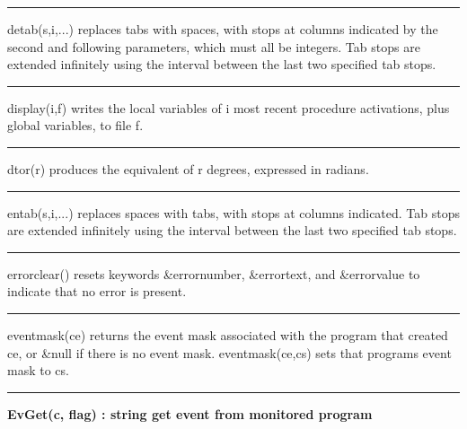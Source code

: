 \bigskip\hrule\vspace{0.1cm}

\noindent
detab(s,i,...) replaces tabs with spaces, with stops at columns
indicated by the second and following parameters, which must all be
integers. Tab stops are extended infinitely using the interval between
the last two specified tab stops.

\bigskip\hrule\vspace{0.1cm}

\noindent
{}display(i,f) writes the local variables of i most
recent procedure activations, plus global variables, to file f.

\bigskip\hrule\vspace{0.1cm}

\noindent
{}dtor(r) produces the
equivalent of r degrees, expressed in radians.

\bigskip\hrule\vspace{0.1cm}

\noindent
entab(s,i,...) replaces spaces with tabs, with stops at columns
indicated. Tab stops are extended infinitely using the interval between
the last two specified tab stops.

\bigskip\hrule\vspace{0.1cm}

\noindent
{}errorclear() resets keywords \&errornumber,
\&errortext, and \&errorvalue to indicate that no error is present.

\bigskip\hrule\vspace{0.1cm}

\noindent
{}eventmask(ce) returns the event mask associated
with the program that created ce, or \&null if there is no event mask.
eventmask(ce,cs) sets that program{\textquotesingle}s event mask to cs.

\bigskip\hrule\vspace{0.1cm}
\noindent
{\bf EvGet(c, flag) : string \hfill get event from monitored program}

